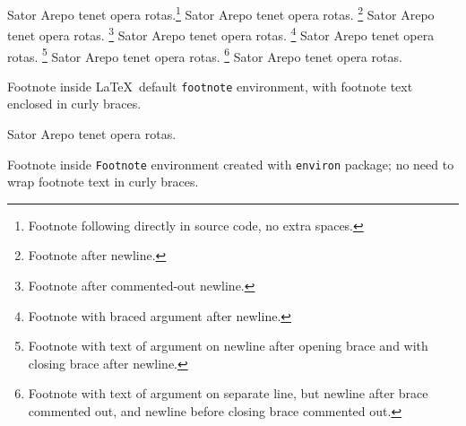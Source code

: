\documentclass{article}
\newcommand{\sator}{Sator Arepo tenet opera rotas}
\begin{document}
\sator.\footnote{Footnote following directly in source code, no extra spaces.} %
\sator.
  \footnote{Footnote after newline.} %
\sator.%
  \footnote{Footnote after commented-out newline.} %
\sator.%
  \footnote
    {Footnote with braced argument after newline.} %
\sator.%
  \footnote{
    Footnote with text of argument on newline after opening brace and with closing brace after newline.
  } %
\sator.%
  \footnote{%
    Footnote with text of argument on separate line, but newline after brace commented out, and newline before closing brace commented out.%
  } %
\sator.%
  \begin{footnote}
    {Footnote inside \LaTeX\ default \texttt{footnote} environment, with footnote text enclosed in curly braces.}
  \end{footnote} %
\sator.%
  \begin{Footnote}
    Footnote inside \texttt{Footnote} environment created with \texttt{environ} package; no need to wrap footnote text in curly braces.
  \end{Footnote} %
\end{document}
